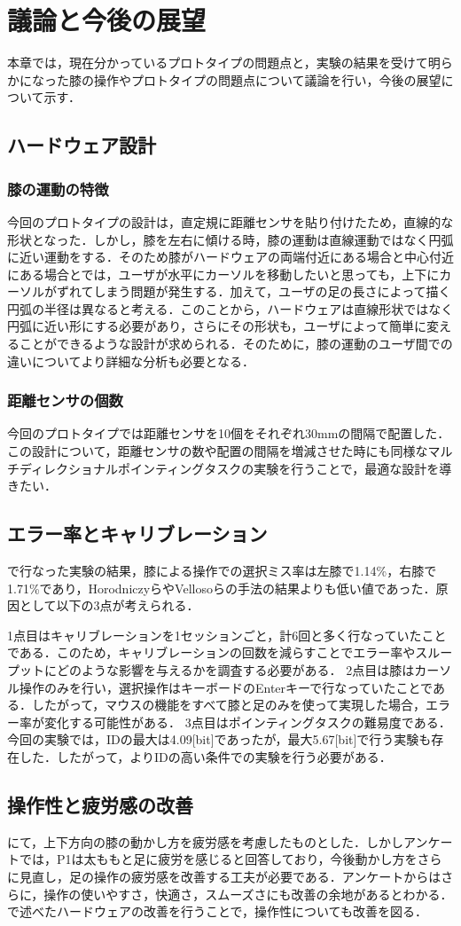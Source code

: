 \chapter{議論と今後の展望}
本章では，現在分かっているプロトタイプの問題点と，実験の結果を受けて明らかになった膝の操作やプロトタイプの問題点について議論を行い，今後の展望について示す．
\section{ハードウェア設計}
\subsection{膝の運動の特徴}
今回のプロトタイプの設計は，直定規に距離センサを貼り付けたため，直線的な形状となった．しかし，膝を左右に傾ける時，膝の運動は直線運動ではなく円弧に近い運動をする．そのため膝がハードウェアの両端付近にある場合と中心付近にある場合とでは，ユーザが水平にカーソルを移動したいと思っても，上下にカーソルがずれてしまう問題が発生する．加えて，ユーザの足の長さによって描く円弧の半径は異なると考える．このことから，ハードウェアは直線形状ではなく円弧に近い形にする必要があり，さらにその形状も，ユーザによって簡単に変えることができるような設計が求められる．そのために，膝の運動のユーザ間での違いについてより詳細な分析も必要となる．
\subsection{距離センサの個数}
今回のプロトタイプでは距離センサを10個をそれぞれ30\si{mm}の間隔で配置した．この設計について，距離センサの数や配置の間隔を増減させた時にも同様なマルチディレクショナルポインティングタスクの実験を行うことで，最適な設計を導きたい．

\section{エラー率とキャリブレーション}
で行なった実験の結果，膝による操作での選択ミス率は左膝で1.14\%，右膝で1.71\%であり，Horodniczyら\cite{Horodniczy:2017:FHE:3025453.3025625}やVellosoら\cite{velloso:hal-01599657}の手法の結果よりも低い値であった．原因として以下の3点が考えられる．

1点目はキャリブレーションを1セッションごと，計6回と多く行なっていたことである．このため，キャリブレーションの回数を減らすことでエラー率やスループットにどのような影響を与えるかを調査する必要がある．
2点目は膝はカーソル操作のみを行い，選択操作はキーボードのEnterキーで行なっていたことである．したがって，マウスの機能をすべて膝と足のみを使って実現した場合，エラー率が変化する可能性がある．
3点目はポインティングタスクの難易度である．今回の実験では，IDの最大は4.09[bit]であったが，最大5.67[bit]で行う実験も存在した\cite{Horodniczy:2017:FHE:3025453.3025625, velloso:hal-01599657}．したがって，よりIDの高い条件での実験を行う必要がある．

\section{操作性と疲労感の改善}
にて，上下方向の膝の動かし方を疲労感を考慮したものとした．しかしアンケートでは，P1は太ももと足に疲労を感じると回答しており，今後動かし方をさらに見直し，足の操作の疲労感を改善する工夫が必要である．アンケートからはさらに，操作の使いやすさ，快適さ，スムーズさにも改善の余地があるとわかる．で述べたハードウェアの改善を行うことで，操作性についても改善を図る．
